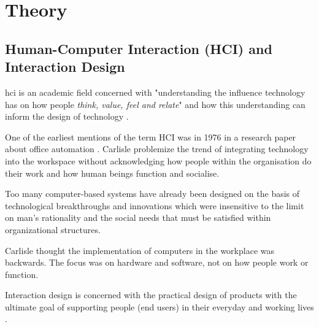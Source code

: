     

\chapter{Theory}

\section{Human-Computer Interaction (HCI) and Interaction Design}
\acrshort{hci} is an academic field concerned with "understanding the influence technology has on how people \textit{think, value, feel and relate}" and how this understanding can inform the design of technology \parencite{wright_empathy_2008}. 


One of the earliest mentions of the term HCI was in 1976 in a research paper about office automation \parencite{Carlisle1976}. Carlisle problemize the trend of integrating technology into the workspace without acknowledging how people within the organisation do their work and how human beings function and socialise. 
\begin{displayquote}
    Too many computer-based systems have already been designed on the basis of technological breakthroughs and innovations which were insensitive to the limit on man's rationality and the social needs that must be satisfied within organizational structures.
\end{displayquote}

Carlisle thought the implementation of computers in the workplace was backwards. The focus was on hardware and software, not on how people work or function. 

Interaction design is concerned with the practical design of products with the ultimate goal of supporting people (end users) in their everyday and working lives \parencite{rogers_interaction_2011}.

